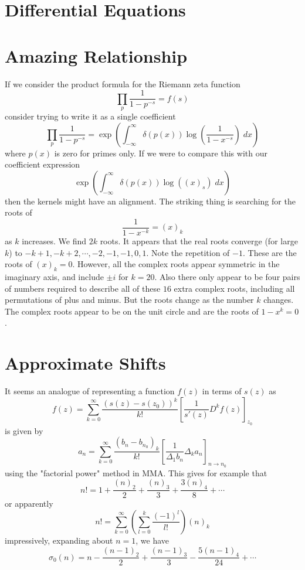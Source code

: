 \documentclass{article}
\begin{document}
\section{Differential Equations}



\section{Amazing Relationship}
If we consider the product formula for the Riemann zeta function 
$$
\prod_p \frac{1}{1-p^{-s}} = f(s)
$$
consider trying to write it as a single coefficient
$$
\prod_p \frac{1}{1-p^{-s}} = \exp\left(\int_{-\infty}^\infty \delta(p(x)) \log\left(\frac{1}{1-x^{-s}}\right) \; dx \right)
$$
where $p(x)$ is zero for primes only. If we were to compare this with our coefficient expression
$$
\exp\left(\int_{-\infty}^\infty \delta(p(x)) \log\left((x)_s\right) \; dx \right)
$$
then the kernels might have an alignment. The striking thing is searching for the roots of 
$$
\frac{1}{1-x^{-k}} = (x)_k
$$
as $k$ increases. We find $2k$ roots. It appears that the real roots converge (for large $k$) to $ -k+1, -k+2, \cdots, -2, -1, -1 ,0, 1$. Note the repetition of $-1$. These are the roots of $(x)_k=0$. However, all the complex roots appear symmetric in the imaginary axis, and include $ \pm i$ for $k=20$. Also there only appear to be four pairs of numbers required to describe all of these $16$ extra complex roots, including all permutations of plus and minus. But the roots change as the number $k$ changes. The complex roots appear to be on the unit circle and are the roots of $1-x^k=0$.






\section{Approximate Shifts}
It seems an analogue of representing a function $f(z)$ in terms of $s(z)$ as 
$$
f(z) = \sum_{k=0}^\infty \frac{(s(z)-s(z_0))^k}{k!}\left[\frac{1}{s'(z)}D^k f(z) \right]_{z_0}
$$
is given by
$$
a_n = \sum_{k=0}^\infty \frac{(b_n-b_{n_0})_k}{k!}\left[\frac{1}{\Delta_1 b_n} \Delta_k a_n \right]_{n\to n_0}
$$
using the "factorial power" method in MMA. This gives for example that
$$
n! = 1 + \frac{(n)_2}{2} + \frac{(n)_3}{3} + \frac{3(n)_4}{8} + \cdots
$$
or apparently
$$
n! = \sum_{k=0}^\infty \left(\sum_{l=0}^k \frac{(-1)^l}{l!}\right) (n)_k
$$
impressively, expanding about $n=1$, we have
$$
\sigma_0(n) = n - \frac{(n-1)_2}{2} + \frac{(n-1)_3}{3} - \frac{5(n-1)_4}{24} + \cdots
$$
\end{document}
